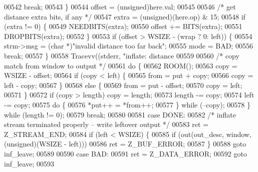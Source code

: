 \begin{DoxyCode}
{{{{{{{{{{{00542                 \textcolor{keywordflow}{break};
00543             \}
00544             offset = (unsigned)here.val;
00545 
00546             \textcolor{comment}{/* get distance extra bits, if any */}
00547             extra = (\textcolor{keywordtype}{unsigned})(here.op) & 15;
00548             \textcolor{keywordflow}{if} (extra != 0) \{
00549                 NEEDBITS(extra);
00550                 offset += BITS(extra);
00551                 DROPBITS(extra);
00552             \}
00553             \textcolor{keywordflow}{if} (offset > WSIZE - (wrap ? 0: left)) \{
00554                 strm->msg = (\textcolor{keywordtype}{char} *)\textcolor{stringliteral}{"invalid distance too far back"};
00555                 mode = BAD;
00556                 \textcolor{keywordflow}{break};
00557             \}
00558             Tracevv((stderr, \textcolor{stringliteral}{"inflate:         distance %
00559 
00560             \textcolor{comment}{/* copy match from window to output */}
00561             \textcolor{keywordflow}{do} \{
00562                 ROOM();
00563                 copy = WSIZE - offset;
00564                 \textcolor{keywordflow}{if} (copy < left) \{
00565                     from = put + copy;
00566                     copy = left - copy;
00567                 \}
00568                 \textcolor{keywordflow}{else} \{
00569                     from = put - offset;
00570                     copy = left;
00571                 \}
00572                 \textcolor{keywordflow}{if} (copy > length) copy = length;
00573                 length -= copy;
00574                 left -= copy;
00575                 \textcolor{keywordflow}{do} \{
00576                     *put++ = *from++;
00577                 \} \textcolor{keywordflow}{while} (--copy);
00578             \} \textcolor{keywordflow}{while} (length != 0);
00579             \textcolor{keywordflow}{break};
00580 
00581         \textcolor{keywordflow}{case} DONE:
00582             \textcolor{comment}{/* inflate stream terminated properly -- write leftover output */}
00583             ret = Z\_STREAM\_END;
00584             \textcolor{keywordflow}{if} (left < WSIZE) \{
00585                 \textcolor{keywordflow}{if} (out(out\_desc, window, (\textcolor{keywordtype}{unsigned})(WSIZE - left)))
00586                     ret = Z\_BUF\_ERROR;
00587             \}
00588             \textcolor{keywordflow}{goto} inf\_leave;
00589 
00590         \textcolor{keywordflow}{case} BAD:
00591             ret = Z\_DATA\_ERROR;
00592             \textcolor{keywordflow}{goto} inf\_leave;
00593 
}}}}}}}}}}}}
\end{DoxyCode}
